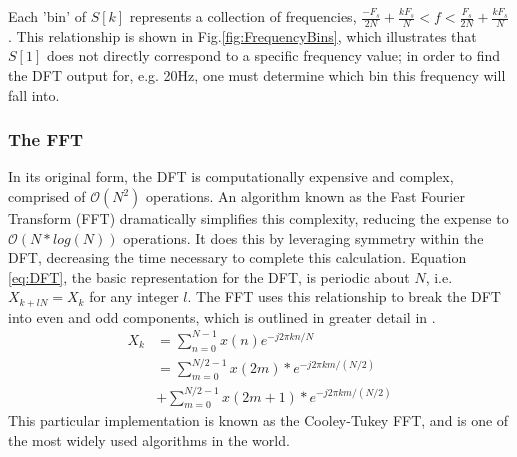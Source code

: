 \documentclass[conference]{IEEEtran}
\begin{document}
Each 'bin' of $S[k]$ represents a collection of frequencies, $\frac{-F_{s}}{2N} + \frac{kF_{s}}{N} < f < \frac{F_{s}}{2N} + \frac{kF_{s}}{N}$. This relationship is shown in Fig.\eqref{fig:FrequencyBins}, which illustrates that $S[1]$ does not directly correspond to a specific frequency value; in order to find the DFT output for, e.g. 20Hz, one must determine which bin this frequency will fall into.
\subsubsection{The FFT}\label{sec:TheFFT}
In its original form, the DFT is computationally expensive and complex, comprised of $\mathcal{O}(N^{2})$ operations. An algorithm known as the Fast Fourier Transform (FFT) dramatically simplifies this complexity, reducing the expense to $\mathcal{O}(N*log(N))$ operations. It does this by leveraging symmetry within the DFT, decreasing the time necessary to complete this calculation. Equation \eqref{eq:DFT}, the basic representation for the DFT, is periodic about $N$, i.e. $X_{k+lN}=X_{k}$ for any integer $l$. The FFT uses this relationship to break the DFT into even and odd components, which is outlined in greater detail in \cite{hayesSchaumOutlineTheory1999}.
\begin{equation}\label{eq:FFT}
  \begin{split}
 X_{k} & =\sum_{n=0}^{N-1}{x(n)e^{-j2\pi kn/N}}\\
  & =\sum_{m=0}^{N/2-1}{x(2m)*e^{-j2\pi km/(N/2)}}\\ & + \sum_{m=0}^{N/2-1}{x(2m+1)*e^{-j2\pi km/(N/2)}}
  \end{split}
\end{equation}
This particular implementation is known as the Cooley-Tukey FFT, and is one of the most widely used algorithms in the world. 
\end{document}
